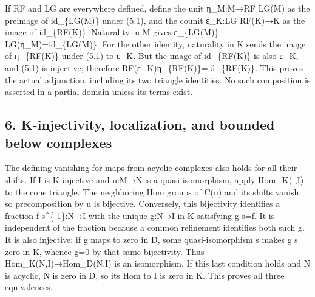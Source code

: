 If RF and LG are everywhere defined,\allowbreak{} define the unit η\_\allowbreak{}M:\allowbreak{}M\allowbreak{}→RF LG(M)\allowbreak{} as the preimage of id\_\allowbreak{}\{LG(M)\allowbreak{}\} under (5.1)\allowbreak{},\allowbreak{} and the counit ε\_\allowbreak{}K:\allowbreak{}LG RF(K)\allowbreak{}\allowbreak{}→K as the image of id\_\allowbreak{}\{RF(K)\allowbreak{}\}. Naturality in M gives ε\_\allowbreak{}\{LG(M)\allowbreak{}\} LG(η\_\allowbreak{}M)\allowbreak{}\allowbreak{}=id\_\allowbreak{}\{LG(M)\allowbreak{}\}. For the other identity,\allowbreak{} naturality in K sends the image of η\_\allowbreak{}\{RF(K)\allowbreak{}\} under (5.1)\allowbreak{} to ε\_\allowbreak{}K. But the image of id\_\allowbreak{}\{RF(K)\allowbreak{}\} is also ε\_\allowbreak{}K,\allowbreak{} and (5.1)\allowbreak{} is injective; therefore RF(ε\_\allowbreak{}K)\allowbreak{}η\_\allowbreak{}\{RF(K)\allowbreak{}\}\allowbreak{}=id\_\allowbreak{}\{RF(K)\allowbreak{}\}. This proves the actual adjunction,\allowbreak{} including its two triangle identities. No such composition is asserted in a partial domain unless its terms exist.

\subsection{\texorpdfstring{6. K-injectivity,\allowbreak{} localization,\allowbreak{} and bounded below complexes}{6.   and bounded below complexes}}\label{proofs-9206-9744-k-injectivity-localization-and-bounded-below-complexes}

The defining vanishing for maps from acyclic complexes also holds for all their shifts. If I is K-injective and u:\allowbreak{}M\allowbreak{}→N is a quasi-isomorphism,\allowbreak{} apply Hom\_\allowbreak{}K(-,\allowbreak{}I)\allowbreak{} to the cone triangle. The neighboring Hom groups of C(u)\allowbreak{} and its shifts vanish,\allowbreak{} so precomposition by u is bijective. Conversely,\allowbreak{} this bijectivity identifies a fraction f s\textasciicircum{}\{-1\}:\allowbreak{}N\allowbreak{}→I with the unique g:\allowbreak{}N\allowbreak{}→I in K satisfying g s\allowbreak{}=f. It is independent of the fraction because a common refinement identifies both such g. It is also injective:\allowbreak{} if g maps to zero in D,\allowbreak{} some quasi-isomorphism s makes g s zero in K,\allowbreak{} whence g\allowbreak{}=0 by that same bijectivity. Thus Hom\_\allowbreak{}K(N,\allowbreak{}I)\allowbreak{}\allowbreak{}→Hom\_\allowbreak{}D(N,\allowbreak{}I)\allowbreak{} is an isomorphism. If this last condition holds and N is acyclic,\allowbreak{} N is zero in D,\allowbreak{} so its Hom to I is zero in K. This proves all three equivalences.

